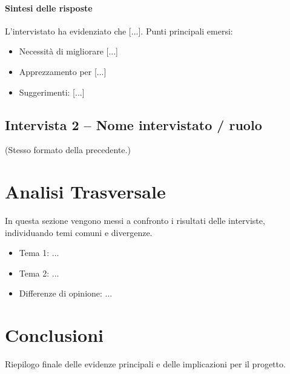 \documentclass[12pt,a4paper]{article}
\begin{document}
\paragraph{Sintesi delle risposte}
L’intervistato ha evidenziato che [...].  
Punti principali emersi:
\begin{itemize}
  \item Necessità di migliorare [...]
  \item Apprezzamento per [...]
  \item Suggerimenti: [...]
\end{itemize}

\subsection{Intervista 2 – Nome intervistato / ruolo}
(Stesso formato della precedente.)

\section{Analisi Trasversale}
In questa sezione vengono messi a confronto i risultati delle interviste, individuando temi comuni e divergenze.  
\begin{itemize}
  \item Tema 1: ...
  \item Tema 2: ...
  \item Differenze di opinione: ...
\end{itemize}

\section{Conclusioni}
Riepilogo finale delle evidenze principali e delle implicazioni per il progetto.

\newpage
\printbibliography
\end{document}
